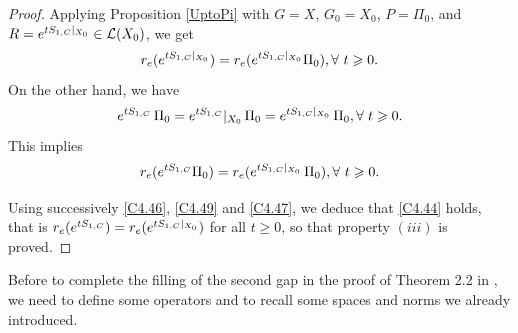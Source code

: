 \documentclass[10pt, english]{article}
\begin{document}
{\begin{proof}
 Applying Proposition \ref{UptoPi} with $G=X$, $G_0=X_0$, $P=\Pi_0$, and $R= e^{tS_{1,C}\small{|}_{X_0}} \in \mathcal{L}(X_0)$, we get 
 \begin{equation}\label{C4.47}%
 r_e(e^{tS_{1,C}\small{|}_{X_0}})=r_e(e^{tS_{1,C}\small{|}_{X_0}}\Pi_0), \forall \ t \geqslant 0.
 \end{equation}
 On the other hand, we have
 \begin{equation}\label{C4.48}%
 e^{tS_{1,C}}\,\Pi_0=e^{tS_{1,C}}\small{|}_{X_0}\, \Pi_0=e^{tS_{1,C}\small{|}_{X_0}}\,\Pi_0, \forall \ t \geqslant 0.
 \end{equation}
 This implies
 \begin{equation}\label{C4.49}%
 r_e(e^{tS_{1,C}}\Pi_0)= r_e(e^{tS_{1,C}\small{|}_{X_0}}\,\Pi_0), \forall \ t \geqslant 0.
 \end{equation}

 Using successively \eqref{C4.46}, \eqref{C4.49} and \eqref{C4.47}, we deduce that \eqref{C4.44} holds, that is 
$r_e(e^{tS_{1,C}})=r_e(e^{tS_{1,C}\small{|}_{X_0}})$ for all  $t \geqslant 0$, so that property $(iii)$ is proved.

 \end{proof}
 
 
Before to complete the filling of the second gap in the proof of Theorem 2.2 in \cite{SW2003} , we need to define some operators and to recall some spaces and norms we already introduced.

}
\end{document}

